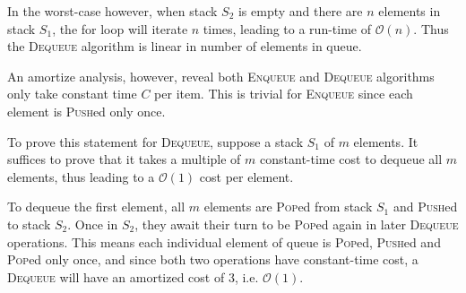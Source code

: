In the worst-case however, when stack $S_2$ is empty and there are $n$ elements in stack $S_1$, the for loop will iterate $n$ times, leading to a run-time of $\mathcal{O}(n)$.
Thus the \textsc{Dequeue} algorithm is linear in number of elements in queue.

An amortize analysis, however, reveal both \textsc{Enqueue} and \textsc{Dequeue} algorithms only take constant time $C$ per item.
This is trivial for \textsc{Enqueue} since each element is \textsc{Push}ed only once.

To prove this statement for \textsc{Dequeue}, suppose a stack $S_1$ of $m$ elements.
It suffices to prove that it takes a multiple of $m$ constant-time cost to dequeue all $m$ elements, thus leading to a $\mathcal{O}(1)$ cost per element.

To dequeue the first element, all $m$ elements are \textsc{Pop}ed from stack $S_1$ and \textsc{Push}ed to stack $S_2$.
Once in $S_2$, they await their turn to be \textsc{Pop}ed again in later \textsc{Dequeue} operations.
This means each individual element of queue is \textsc{Pop}ed, \textsc{Push}ed and \textsc{Pop}ed only once, and since both two operations have constant-time cost, a \textsc{Dequeue} will have an amortized cost of 3, i.e. $\mathcal{O}(1)$.
